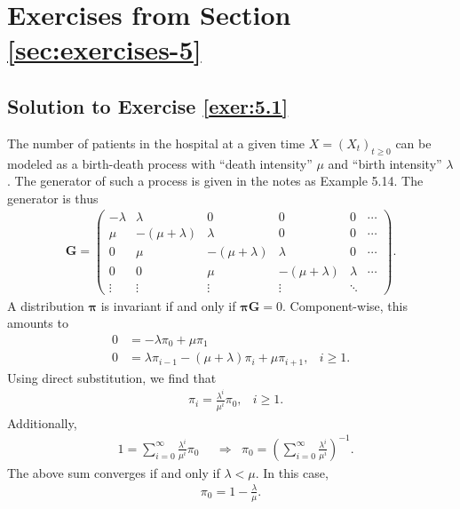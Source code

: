 \documentclass[12pt]{book}
\numberwithin{equation}{chapter}
\theoremstyle{plain}
\numberwithin{theorem}{section}
\theoremstyle{definition}
\numberwithin{exercise}{chapter}
\newcommand{\<}{\langle}
\renewcommand{\>}{\rangle}
\renewcommand{\(}{\left(}
\renewcommand{\)}{\right)}
\renewcommand{\[}{\left[}
\renewcommand{\]}{\right]}
\newcommand\Gv{\pmb{G}}
\newcommand\piv{\pmb{\pi}}
\begin{document}

\section{Exercises from Section \ref{sec:exercises-5}}

\subsection*{Solution to Exercise \ref{exer:5.1}}
The number of patients in the hospital at a given time $X = (X_t)_{t\geq 0}$ can be modeled as a birth-death process 
with ``death intensity'' $\mu$ and ``birth intensity'' $\lambda$. The generator of such a process is given in the notes 
as Example 5.14. The generator is thus
\begin{align}
\Gv
	= 
	\begin{pmatrix}
	-\lambda & \lambda & 0 & 0 & 0 & \cdots \\
	\mu & - ( \mu + \lambda) & \lambda & 0 & 0 & \cdots \\
	0 & \mu & - ( \mu + \lambda) & \lambda & 0  & \cdots\\
	0 & 0 & \mu & - ( \mu + \lambda) & \lambda & \cdots \\
	\vdots & \vdots & \vdots & \vdots & \ddots 
	\end{pmatrix}.
\end{align}
A distribution $\piv$ is invariant if and only if $\piv \Gv = 0$. Component-wise, this amounts to 
\begin{align}
0
	&= -\lambda \pi_0 + \mu \pi_1 \\
0
	&= \lambda \pi_{i-1}  - ( \mu + \lambda) \pi_i + \mu \pi_{i+1},
	& i \geq 1.
\end{align}
Using direct substitution, we find that
\begin{align}
&\pi_i
	= \frac{\lambda^i}{\mu^i} \pi_0,
&i \geq 1.
\end{align}
Additionally, 
\begin{align}
&1 
	= \sum_{i=0}^\infty \frac{ \lambda^i}{\mu^i} \pi_0
&&\Rightarrow
&\pi_0 
	= \( \sum_{i =0}^\infty  \frac{ \lambda^i}{\mu^i} \)^{-1}.
\end{align}
The above sum converges if and only if $\lambda < \mu$. In this case, 
\begin{align}
\pi_0
	= 1 - \frac{\lambda}{\mu}.
\end{align}
\end{document}
